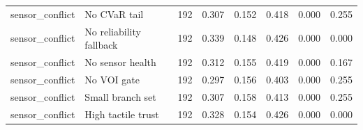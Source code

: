 \begin{table}[t]
\begin{tabular}{llrrrrrr}
sensor\_conflict & No CVaR tail & 192 & 0.307 & 0.152 & 0.418 & 0.000 & 0.255 \\
sensor\_conflict & No reliability fallback & 192 & 0.339 & 0.148 & 0.426 & 0.000 & 0.000 \\
sensor\_conflict & No sensor health & 192 & 0.312 & 0.155 & 0.419 & 0.000 & 0.167 \\
sensor\_conflict & No VOI gate & 192 & 0.297 & 0.156 & 0.403 & 0.000 & 0.255 \\
sensor\_conflict & Small branch set & 192 & 0.307 & 0.158 & 0.413 & 0.000 & 0.255 \\
sensor\_conflict & High tactile trust & 192 & 0.328 & 0.154 & 0.426 & 0.000 & 0.000 \\
\bottomrule
\end{tabular}
\end{table}
